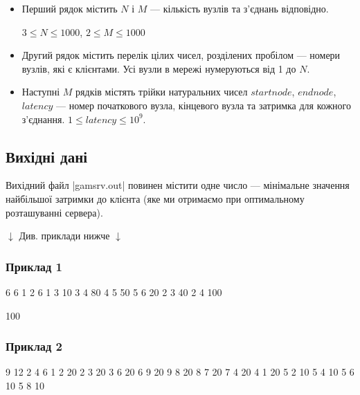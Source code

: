 \documentclass[12pt,a4paper]{article}
\begin{document}
\begin{itemize}
    \item Перший рядок містить \(N\) і \(M\) --- кількість вузлів та з’єднань відповідно.

    \(3 \leq N \leq 1000\), \(2 \leq M \leq 1000\)
    \item Другий рядок містить перелік цілих чисел, розділених пробілом --- номери вузлів, які є клієнтами. Усі вузли в мережі нумеруються від 1 до \(N\).
    \item Наступні \(M\) рядків містять трійки натуральних чисел \(startnode\), \(endnode\), \(latency\) --- номер початкового вузла, кінцевого вузла та затримка для кожного з’єднання. \(1 \leq latency \leq 10^9\).
\end{itemize}


\subsection*{Вихідні дані}

Вихідний файл |gamsrv.out| повинен містити одне число --- мінімальне значення найбільшої затримки до клієнта (яке ми отримаємо при оптимальному розташуванні сервера).


\begin{pagebottomtext}
$\downarrow$ Див. приклади нижче $\downarrow$
\end{pagebottomtext}


\pagebreak


\subsubsection*{Приклад 1}

\textbf{}

\begin{codeblock}
6 6
1 2 6
1 3 10
3 4 80
4 5 50
5 6 20
2 3 40
2 4 100
\end{codeblock}

\textbf{}

\begin{codeblock}
100
\end{codeblock}


\subsubsection*{Приклад 2}

\textbf{}

\begin{codeblock}
9 12
2 4 6
1 2 20
2 3 20
3 6 20
6 9 20
9 8 20
8 7 20
7 4 20
4 1 20
5 2 10
5 4 10
5 6 10
5 8 10
\end{codeblock}
\end{document}
